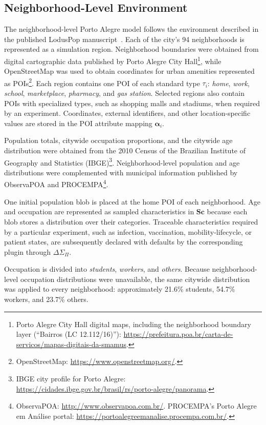 \subsection{Neighborhood-Level Environment}

The neighborhood-level Porto Alegre model follows the environment described in the published LodusPop manuscript~\cite{silva2026lodusPop}. Each of the city's 94 neighborhoods is represented as a simulation region. Neighborhood boundaries were obtained from digital cartographic data published by Porto Alegre City Hall\footnote{Porto Alegre City Hall digital maps, including the neighborhood boundary layer (``Bairros (LC 12.112/16)''): \url{https://prefeitura.poa.br/carta-de-servicos/mapas-digitais-da-smamus}.}, while OpenStreetMap was used to obtain coordinates for urban amenities represented as POIs\footnote{OpenStreetMap: \url{https://www.openstreetmap.org/}.}. Each region contains one POI of each standard type $\tau_i$: \textit{home}, \textit{work}, \textit{school}, \textit{marketplace}, \textit{pharmacy}, and \textit{gas station}.
Selected regions also contain POIs with specialized types, such as shopping malls and stadiums, when required by an experiment. Coordinates, external identifiers, and other location-specific values are stored in the POI attribute mapping $\bm{\alpha}_i$.


Population totals, citywide occupation proportions, and the citywide age distribution were obtained from the 2010 Census of the Brazilian Institute of Geography and Statistics (IBGE)\footnote{IBGE city profile for Porto Alegre: \url{https://cidades.ibge.gov.br/brasil/rs/porto-alegre/panorama}.}. Neighborhood-level population and age distributions were complemented with municipal information published by ObservaPOA and PROCEMPA\footnote{ObservaPOA: \url{http://www.observapoa.com.br/}. PROCEMPA's Porto Alegre em Análise portal: \url{https://portoalegreemanalise.procempa.com.br/}.}.


One initial population blob is placed at the home POI of each neighborhood. Age and occupation are represented as sampled characteristics in $\bm{Sc}$ because each blob stores a distribution over their categories. Traceable characteristics required by a particular experiment, such as infection, vaccination, mobility-lifecycle, or patient states, are subsequently declared with defaults by the corresponding plugin through $\Delta\Sigma_{\Pi}$.

Occupation is divided into \textit{students}, \textit{workers}, and \textit{others}. Because neighborhood-level occupation distributions were unavailable, the same citywide distribution was applied to every neighborhood: approximately 21.6\% students, 54.7\% workers, and 23.7\% others. 


